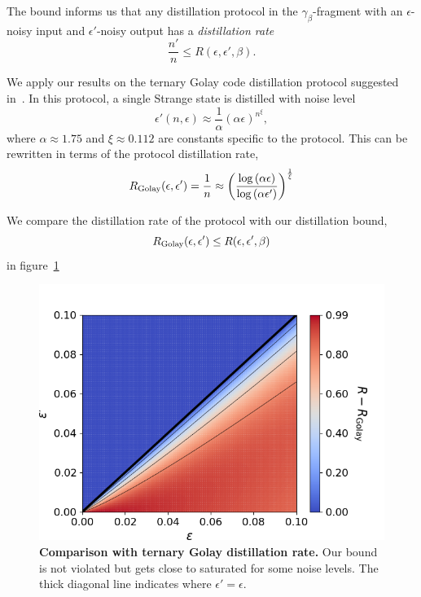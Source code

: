 \documentclass[pra,
aps,
twocolumn,
superscriptaddress,
groupedaddress,
nofootinbib,
reprint
]{revtex4-1}
\begin{document}
The bound informs us that any distillation protocol in the $\gamma_\beta$-fragment with an $\epsilon$-noisy input and $\epsilon'$-noisy output has a \emph{distillation rate} 
\begin{equation}
	\frac{n'}{n} \leq R(\epsilon, \epsilon', \beta).
\end{equation}

We apply our results on the ternary Golay code distillation protocol suggested in~\cite{cit:prakash}.
In this protocol, a single Strange state is distilled with noise level
\begin{equation}
	\epsilon'(n, \epsilon) \approx \frac{1}{\alpha}(\alpha\epsilon)^{n^\xi},
\end{equation}
where $\alpha \approx 1.75$ and $\xi \approx 0.112$ are constants specific to the protocol.
This can be rewritten in terms of the protocol distillation rate,
\begin{equation}
	R_{\rm{Golay}}(\epsilon, \epsilon') = \frac{1}{n} \approx \left( \frac{\log{(\alpha \epsilon)}}{\log{(\alpha \epsilon')}} \right)^{\frac{1}{\xi}}
\end{equation}

We compare the distillation rate of the protocol with our distillation bound, 
\begin{equation}
	R_{\rm{Golay}}(\epsilon, \epsilon') \leq R(\epsilon, \epsilon', \beta)
\end{equation} 
in figure~\cref{fig:prakash_compare}
\begin{figure}[h]
    \centering
    \includegraphics[scale=0.5]{figs/prakash_compare.png}
    \caption{\textbf{Comparison with ternary Golay distillation rate.}
    Our bound is not violated but gets close to saturated for some noise levels.
    The thick diagonal line indicates where $\epsilon' = \epsilon$.
    }
    \label{fig:prakash_compare}
\end{figure}
\end{document}
